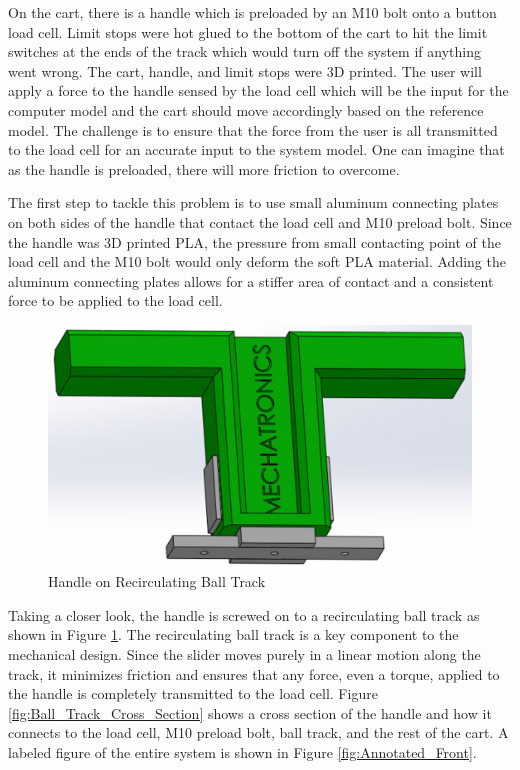 On the cart, there is a handle which is preloaded by an M10 bolt onto a button load cell. Limit stops were hot glued to the bottom of the cart to hit the limit switches at the ends of the track which would turn off the system if anything went wrong. The cart, handle, and limit stops were 3D printed. The user will apply a force to the handle sensed by the load cell which will be the input for the computer model and the cart should move accordingly based on the reference model. The challenge is to ensure that the force from the user is all transmitted to the load cell for an accurate input to the system model. One can imagine that as the handle is preloaded, there will more friction to overcome.

The first step to tackle this problem is to use small aluminum connecting plates on both sides of the handle that contact the load cell and M10 preload bolt. Since the handle was 3D printed PLA, the pressure from small contacting point of the load cell and the M10 bolt would only deform the soft PLA material. Adding the aluminum connecting plates allows for a stiffer area of contact and a consistent force to be applied to the load cell.

\begin{figure}[H]
	\centering
	\includegraphics[width=1\columnwidth]{Images/Recirculating_Ball_Track}
	\caption{Handle on Recirculating Ball Track}
	\label{fig:Recirculating_Ball_Track}
\end{figure}

Taking a closer look, the handle is screwed on to a recirculating ball track as shown in Figure \ref{fig:Recirculating_Ball_Track}. The recirculating ball track is a key component to the mechanical design. Since the slider moves purely in a linear motion along the track, it minimizes friction and ensures that any force, even a torque, applied to the handle is completely transmitted to the load cell. Figure \ref{fig:Ball_Track_Cross_Section} shows a cross section of the handle and how it connects to the load cell, M10 preload bolt, ball track, and the rest of the cart. A labeled figure of the entire system is shown in Figure \ref{fig:Annotated_Front}.

